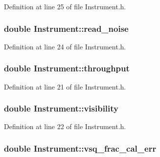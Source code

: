Definition at line 25 of file Instrument.h.

\hypertarget{classInstrument_accb5f463e89c0c73d4c0e5b6b80397af}{
\subsubsection[{read\_\-noise}]{\setlength{\rightskip}{0pt plus 5cm}double {\bf Instrument::read\_\-noise}}}
\label{classInstrument_accb5f463e89c0c73d4c0e5b6b80397af}


Definition at line 24 of file Instrument.h.

\hypertarget{classInstrument_a24c5a78025ce2474443eb34b8828df08}{
\subsubsection[{throughput}]{\setlength{\rightskip}{0pt plus 5cm}double {\bf Instrument::throughput}}}
\label{classInstrument_a24c5a78025ce2474443eb34b8828df08}


Definition at line 21 of file Instrument.h.

\hypertarget{classInstrument_a8a79a07bd650ab75118beff9f46886a6}{
\subsubsection[{visibility}]{\setlength{\rightskip}{0pt plus 5cm}double {\bf Instrument::visibility}}}
\label{classInstrument_a8a79a07bd650ab75118beff9f46886a6}


Definition at line 22 of file Instrument.h.

\hypertarget{classInstrument_ad51820f02768c7632da7d9136ace806f}{
\subsubsection[{vsq\_\-frac\_\-cal\_\-err}]{\setlength{\rightskip}{0pt plus 5cm}double {\bf Instrument::vsq\_\-frac\_\-cal\_\-err}}}
\label{classInstrument_ad51820f02768c7632da7d9136ace806f}


